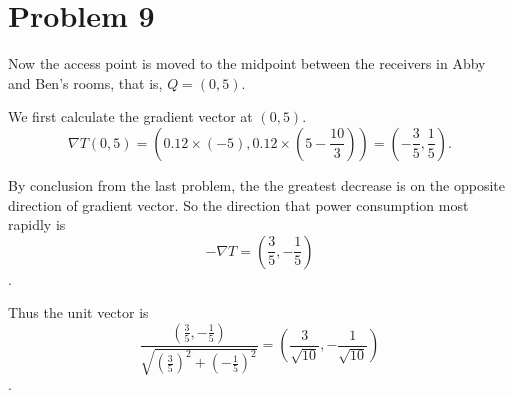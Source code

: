 \documentclass[12pt,a4paper]{article}
\begin{document}
\section*{Problem 9}
Now the access point is moved to the midpoint between the receivers in Abby and Ben’s rooms, that is, $Q=(0, 5)$.

We first calculate the gradient vector at $(0,5)$.
\[
\nabla T(0,5) = \left(0.12\times(-5), 0.12\times (5-\frac{10}{3})\right) = \left(-\frac{3}{5}, \frac{1}{5}\right).
\]

By conclusion from the last problem, the the greatest decrease is on the opposite direction of gradient vector. So the direction that power consumption most rapidly is 
$$-\nabla T = \left(\frac{3}{5}, -\frac{1}{5}\right)$$. 

Thus the unit vector is 
$$\frac{\left(\frac{3}{5}, -\frac{1}{5}\right)}{\sqrt{(\frac{3}{5})^2 + (-\frac{1}{5})^2}} = \left(\frac{3}{\sqrt{10}},-\frac{1}{\sqrt{10}}\right)$$.
\end{document}

